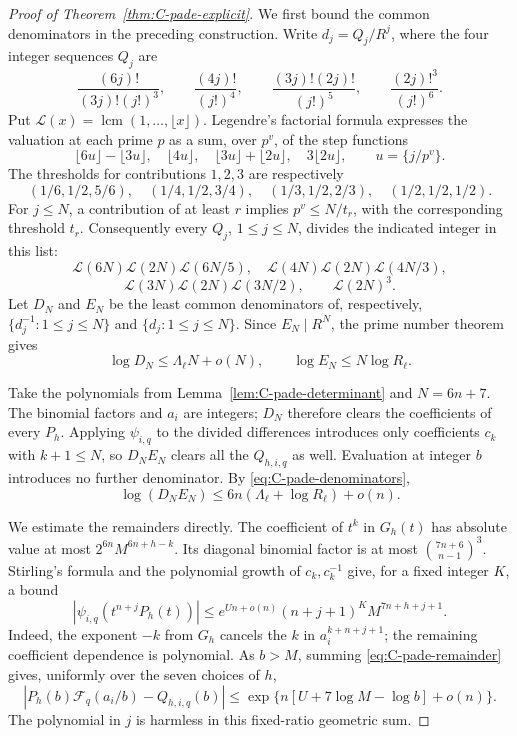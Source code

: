 \begin{proof}[Proof of Theorem~\ref{thm:C-pade-explicit}]
We first bound the common denominators in the preceding construction.
Write $d_j=Q_j/R^j$, where the four integer sequences $Q_j$ are
\[
 \frac{(6j)!}{(3j)!(j!)^3},\qquad
 \frac{(4j)!}{(j!)^4},\qquad
 \frac{(3j)!(2j)!}{(j!)^5},\qquad
 \frac{(2j)!^3}{(j!)^6}.
\]
Put $\mathcal L(x)=\operatorname{lcm}(1,\ldots,\lfloor x\rfloor)$.
Legendre's factorial formula expresses the valuation at each prime $p$
as a sum, over $p^v$, of the step functions
\[
 \lfloor6u\rfloor-\lfloor3u\rfloor,\quad
 \lfloor4u\rfloor,\quad
 \lfloor3u\rfloor+\lfloor2u\rfloor,\quad
 3\lfloor2u\rfloor,\qquad u=\{j/p^v\}.
\]
The thresholds for contributions $1,2,3$ are respectively
\[
 (1/6,1/2,5/6),\quad(1/4,1/2,3/4),\quad
 (1/3,1/2,2/3),\quad(1/2,1/2,1/2).
\]
For $j\le N$, a contribution of at least $r$ implies
$p^v\le N/t_r$, with the corresponding threshold $t_r$.
Consequently every $Q_j$, $1\le j\le N$, divides the indicated
integer in this list:
\[
 \mathcal L(6N)\mathcal L(2N)\mathcal L(6N/5),\quad
 \mathcal L(4N)\mathcal L(2N)\mathcal L(4N/3),
\]
\[
 \mathcal L(3N)\mathcal L(2N)\mathcal L(3N/2),\qquad
 \mathcal L(2N)^3.
\]
Let $D_N$ and $E_N$ be the least common denominators of, respectively,
$\{d_j^{-1}:1\le j\le N\}$ and $\{d_j:1\le j\le N\}$.
Since $E_N\mid R^N$, the prime number theorem gives
\begin{equation}\label{eq:C-pade-denominators}
 \log D_N\le\Lambda_\ell N+o(N),\qquad
 \log E_N\le N\log R_\ell.
\end{equation}

Take the polynomials from Lemma~\ref{lem:C-pade-determinant} and
$N=6n+7$.  The binomial factors and $a_i$ are integers; $D_N$
therefore clears the coefficients of every $P_h$.  Applying
$\psi_{i,q}$ to the divided differences introduces only coefficients
$c_k$ with $k+1\le N$, so $D_NE_N$ clears all the $Q_{h,i,q}$
as well.  Evaluation at integer $b$ introduces no further denominator.
By \eqref{eq:C-pade-denominators},
\begin{equation}\label{eq:C-pade-cost}
 \log(D_NE_N)\le6n(\Lambda_\ell+\log R_\ell)+o(n).
\end{equation}

We estimate the remainders directly.  The coefficient of $t^k$ in
$G_h(t)$ has absolute value at most
$2^{6n}M^{6n+h-k}$.  Its diagonal binomial factor is at most
$\binom{7n+6}{n-1}^{3}$.  Stirling's formula and the polynomial
growth of $c_k,c_k^{-1}$ give, for a fixed integer $K$, a bound
\[
 |\psi_{i,q}(t^{n+j}P_h(t))|
 \le e^{Un+o(n)}(n+j+1)^K M^{7n+h+j+1}.
\]
Indeed, the exponent $-k$ from $G_h$ cancels the $k$ in
$a_i^{k+n+j+1}$; the remaining coefficient dependence is polynomial.
As $b>M$, summing \eqref{eq:C-pade-remainder} gives, uniformly
over the seven choices of $h$,
\begin{equation}\label{eq:C-pade-error}
 |P_h(b)\mathcal F_q(a_i/b)-Q_{h,i,q}(b)|
 \le\exp\{n[U+7\log M-\log b]+o(n)\}.
\end{equation}
The polynomial in $j$ is harmless in this fixed-ratio geometric sum.


\end{proof}

